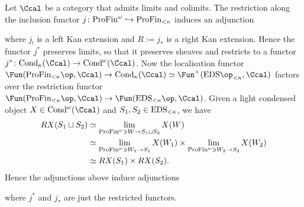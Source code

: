\documentclass[colorinlistoftodos,article,11pt,reqno]{article}
\newcommand{\Cond}{\textup{Cond}}
\newcommand{\ProFin}{\textup{ProFin}}
\newcommand{\EDS}{\textup{EDS}}
\renewcommand{\to}[1][]{\overset{#1}{\rightarrow}}
\newcommand{\inj}[1][]{\overset{#1}{\hookrightarrow}}		%
\renewcommand{\L}{\textup{L}}
\begin{document}
\begin{appendix}
\begin{remark} 
\label{comparison-light-kappa-condensed}
Let $\Ccal$ be a category that admits limits and colimits. The restriction along the inclusion functor $j\colon \ProFin^\omega \inj \ProFin_{<\kappa}$ induces an adjunction

\begin{center}
\end{center}
where $j_!$ is a left Kan extension and $R:=j_*$ is a right Kan extension.
Hence the functor $j^*$ preserves limits, so that it preserves sheaves and restricts to a functor $j^* \colon \Cond_\kappa(\Ccal)\to\Cond^\omega(\Ccal)$. Now the localisation functor $\Fun(\ProFin_{<\kappa}\op,\Ccal) \to \Cond_\kappa(\Ccal) \simeq \Fun^{\times}(\EDS\op_{<\kappa},\Ccal)$ factors over the restriction functor $\Fun(\ProFin_{<\kappa}\op,\Ccal) \to\Fun(\EDS_{<\kappa}\op,\Ccal)$. Given a light condensed object $X\in\Cond^\omega(\Ccal)$ and $S_1,S_2\in\EDS_{<\kappa}$, we have
\begin{align*}
    RX(S_1\sqcup S_2) 
    &\simeq \lim_{\ProFin^\omega\ni W\to S_1\sqcup S_2} X(W) \\
    &\simeq \lim_{\ProFin^\omega\ni W_1\to S_1} X(W_1) \times \lim_{\ProFin^\omega\ni W_2\to S_2} X(W_2) \\
    &\simeq RX(S_1) \times RX(S_2).
\end{align*} 
Hence the adjunctions above induce adjunctions 
\begin{center}
\end{center}
where $j^*$ and $j_*$ are just the restricted functors.

\end{remark}
\end{appendix}
\end{document}

